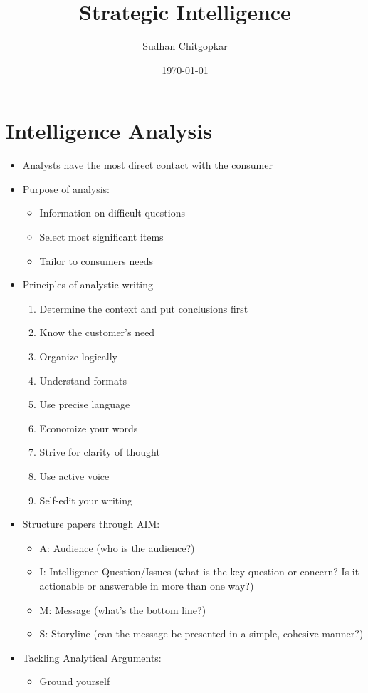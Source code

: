 \documentclass[11pt]{article}
\author{Sudhan Chitgopkar}
\date{\today}
\title{Strategic Intelligence}
\begin{document}
\maketitle
\tableofcontents \clearpage\section{Intelligence Analysis}
\label{sec:org3b97a87}
\begin{itemize}
\item Analysts have the most direct contact with the consumer
\item Purpose of analysis:
\begin{itemize}
\item Information on difficult questions
\item Select most significant items
\item Tailor to consumers needs
\end{itemize}
\item Principles of analystic writing
\begin{enumerate}
\item Determine the context and put conclusions first
\item Know the customer's need
\item Organize logically
\item Understand formats
\item Use precise language
\item Economize your words
\item Strive for clarity of thought
\item Use active voice
\item Self-edit your writing
\end{enumerate}
\item Structure papers through AIM:
\begin{itemize}
\item A: Audience (who is the audience?)
\item I: Intelligence Question/Issues (what is the key question or concern? Is it actionable or answerable in more than one way?)
\item M: Message (what's the bottom line?)
\item S: Storyline (can the message be presented in a simple, cohesive manner?)
\end{itemize}
\item Tackling Analytical Arguments:
\begin{itemize}
\item Ground yourself

\end{itemize}
\end{itemize}
\end{document}
